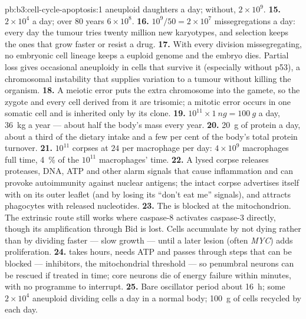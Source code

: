 \begin{solution}{pb:b3:cell-cycle-apoptosis:1}
aneuploid daughters a day; without, $2\times 10^{9}$.
\textbf{15.} $2\times 10^{4}$ a day; over $80$ years $6\times 10^{8}$.
\textbf{16.} $10^{9}/50 = 2\times 10^{7}$ missegregations a day: every
day the tumour tries twenty million new karyotypes, and selection keeps
the ones that grow faster or resist a drug.
\textbf{17.} With every division missegregating, no embryonic cell
lineage keeps a euploid genome and the embryo dies. Partial loss gives
occasional aneuploidy in cells that survive it (especially without
p53), a chromosomal instability that supplies variation to a tumour
without killing the organism.
\textbf{18.} A meiotic error puts the extra chromosome into the gamete,
so the zygote and every cell derived from it are trisomic; a mitotic
error occurs in one somatic cell and is inherited only by its clone.
\textbf{19.} $10^{11}\times \qty{1}{ng} = \qty{100}{g}$ a day,
\qty{36}{kg} a year --- about half the body's mass every year.
\textbf{20.} \qty{20}{g} of protein a day, about a third of the dietary
intake and a few per cent of the body's total protein turnover.
\textbf{21.} $10^{11}$ corpses at $24$ per macrophage per day: $4\times
10^{9}$ macrophages full time, \qty{4}{\%} of the $10^{11}$
macrophages' time.
\textbf{22.} A lysed corpse releases proteases, DNA, ATP and other
alarm signals that cause inflammation and can provoke autoimmunity
against nuclear antigens; the intact corpse advertises itself with
 on its outer leaflet (and by losing its ``don't eat
me'' signals), and attracts phagocytes with released nucleotides.
\textbf{23.} The  is blocked at the mitochondrion. The
extrinsic route still works where caspase-8 activates caspase-3
directly, though its amplification through Bid is lost. Cells
accumulate by not dying rather than by dividing faster --- slow growth
--- until a later lesion (often \emph{MYC}) adds proliferation.
\textbf{24.}  takes hours, needs ATP and passes through
steps that can be blocked ---  inhibitors, the mitochondrial
threshold --- so penumbral neurons can be rescued if treated in time;
core neurons die of energy failure within minutes, with no programme to
interrupt.
\textbf{25.} Bare oscillator period about \qty{16}{h}; some $2\times
10^{4}$ aneuploid dividing cells a day in a normal body; \qty{100}{g}
of cells recycled by  each day.
\end{solution}
